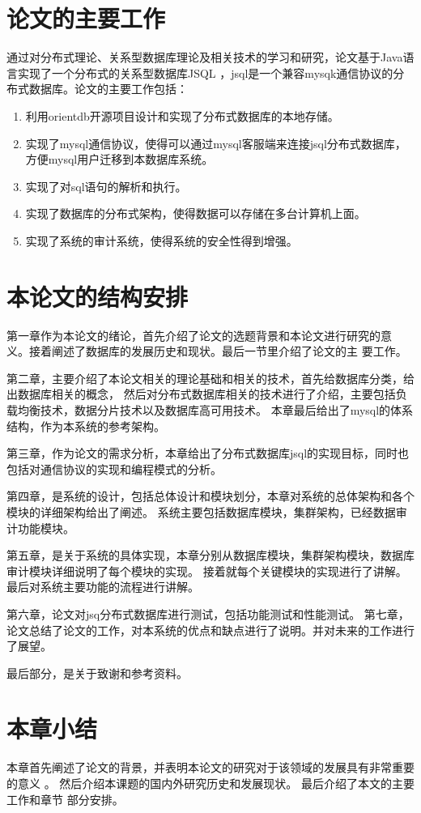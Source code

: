 \section{论文的主要工作}
通过对分布式理论、关系型数据库理论及相关技术的学习和研究，论文基于Java语言实现了一个分布式的关系型数据库JSQL
，jsql是一个兼容mysqk通信协议的分布式数据库。论文的主要工作包括：
\begin{enumerate}
	\item 利用orientdb开源项目设计和实现了分布式数据库的本地存储。
	\item 实现了mysql通信协议，使得可以通过mysql客服端来连接jsql分布式数据库，
	方便mysql用户迁移到本数据库系统。
	\item 实现了对sql语句的解析和执行。
	\item 实现了数据库的分布式架构，使得数据可以存储在多台计算机上面。
	
	\item 实现了系统的审计系统，使得系统的安全性得到增强。
\end{enumerate}
\section{本论文的结构安排}
第一章作为本论文的绪论，首先介绍了论文的选题背景和本论文进行研究的意
义。接着阐述了数据库的发展历史和现状。最后一节里介绍了论文的主
要工作。

第二章，主要介绍了本论文相关的理论基础和相关的技术，首先给数据库分类，给出数据库相关的概念，
然后对分布式数据库相关的技术进行了介绍，主要包括负载均衡技术，数据分片技术以及数据库高可用技术。
本章最后给出了mysql的体系结构，作为本系统的参考架构。

第三章，作为论文的需求分析，本章给出了分布式数据库jsql的实现目标，同时也
包括对通信协议的实现和编程模式的分析。

第四章，是系统的设计，包括总体设计和模块划分，本章对系统的总体架构和各个模块的详细架构给出了阐述。
系统主要包括数据库模块，集群架构，已经数据审计功能模块。

第五章，是关于系统的具体实现，本章分别从数据库模块，集群架构模块，数据库审计模块详细说明了每个模块的实现。
接着就每个关键模块的实现进行了讲解。最后对系统主要功能的流程进行讲解。

第六章，论文对jsq分布式数据库进行测试，包括功能测试和性能测试。
第七章，论文总结了论文的工作，对本系统的优点和缺点进行了说明。并对未来的工作进行了展望。

最后部分，是关于致谢和参考资料。
\section{本章小结}
本章首先阐述了论文的背景，并表明本论文的研究对于该领域的发展具有非常重要的意义
。 然后介绍本课题的国内外研究历史和发展现状。 最后介绍了本文的主要工作和章节
部分安排。